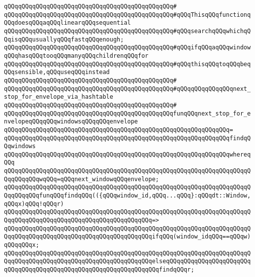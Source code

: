 \verb|qQQqqQQqqQQqqQQqqQQqqQQqqQQqqQQqqQQqqQQqqQQqqQQq#|\newline
\verb|qQQqqQQqqQQqqQQqqQQqqQQqqQQqqQQqqQQqqQQqqQQqqQQq#qQQqThisqQQqfunctionqQQqdoesqQQqaqQQqlinearqQQqsequential|\newline
\verb|qQQqqQQqqQQqqQQqqQQqqQQqqQQqqQQqqQQqqQQqqQQqqQQq#qQQqsearchqQQqwhichqQQqisqQQqusuallyqQQqfastqQQqenough;|\newline
\verb|qQQqqQQqqQQqqQQqqQQqqQQqqQQqqQQqqQQqqQQqqQQqqQQq#qQQqifqQQqaqQQqwindowqQQqhasqQQqtooqQQqmanyqQQqchildrenqQQqfor|\newline
\verb|qQQqqQQqqQQqqQQqqQQqqQQqqQQqqQQqqQQqqQQqqQQqqQQq#qQQqthisqQQqtoqQQqbeqQQqsensible,qQQquseqQQqinstead|\newline
\verb|qQQqqQQqqQQqqQQqqQQqqQQqqQQqqQQqqQQqqQQqqQQqqQQq#|\newline
\verb|qQQqqQQqqQQqqQQqqQQqqQQqqQQqqQQqqQQqqQQqqQQqqQQq#qQQqqQQqqQQqqQQqnext_stop_for_envelope_via_hashtable|\newline
\verb|qQQqqQQqqQQqqQQqqQQqqQQqqQQqqQQqqQQqqQQqqQQqqQQq#|\newline
\verb|qQQqqQQqqQQqqQQqqQQqqQQqqQQqqQQqqQQqqQQqqQQqqQQqfunqQQqnext_stop_for_envelopeqQQqqQQqwindowsqQQqqQQqenvelope|\newline
\verb|qQQqqQQqqQQqqQQqqQQqqQQqqQQqqQQqqQQqqQQqqQQqqQQqqQQqqQQqqQQqqQQq=|\newline
\verb|qQQqqQQqqQQqqQQqqQQqqQQqqQQqqQQqqQQqqQQqqQQqqQQqqQQqqQQqqQQqqQQqfindqQQqwindows|\newline
\verb|qQQqqQQqqQQqqQQqqQQqqQQqqQQqqQQqqQQqqQQqqQQqqQQqqQQqqQQqqQQqqQQqwhereqQQq|\newline
\verb|qQQqqQQqqQQqqQQqqQQqqQQqqQQqqQQqqQQqqQQqqQQqqQQqqQQqqQQqqQQqqQQqqQQqqQQqqQQqqQQqwqQQq=qQQqnext_windowqQQqenvelope;|\newline
\newline
\verb|qQQqqQQqqQQqqQQqqQQqqQQqqQQqqQQqqQQqqQQqqQQqqQQqqQQqqQQqqQQqqQQqqQQqqQQqqQQqqQQqfunqQQqfindqQQq(({qQQqwindow_id,qQQq...qQQq}:qQQqdt::Window,qQQqx)qQQq!qQQqr)|\newline
\verb|qQQqqQQqqQQqqQQqqQQqqQQqqQQqqQQqqQQqqQQqqQQqqQQqqQQqqQQqqQQqqQQqqQQqqQQqqQQqqQQqqQQqqQQqqQQqqQQqqQQqqQQqqQQqqQQq=>|\newline
\verb|qQQqqQQqqQQqqQQqqQQqqQQqqQQqqQQqqQQqqQQqqQQqqQQqqQQqqQQqqQQqqQQqqQQqqQQqqQQqqQQqqQQqqQQqqQQqqQQqqQQqqQQqqQQqqQQqifqQQq(window_idqQQq==qQQqw)qQQqqQQqx;|\newline
\verb|qQQqqQQqqQQqqQQqqQQqqQQqqQQqqQQqqQQqqQQqqQQqqQQqqQQqqQQqqQQqqQQqqQQqqQQqqQQqqQQqqQQqqQQqqQQqqQQqqQQqqQQqqQQqqQQqelseqQQqqQQqqQQqqQQqqQQqqQQqqQQqqQQqqQQqqQQqqQQqqQQqqQQqqQQqqQQqqQQqqQQqfindqQQqr;|\newline
